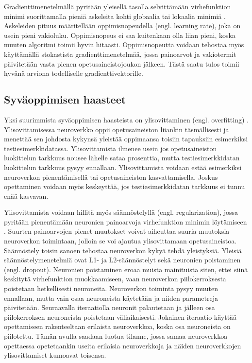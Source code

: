 \documentclass[utf8]{gradu3}
\begin{document}
Gradienttimenetelmällä pyritään yleisellä tasolla selvittämään virhefunktion minimi suorittamalla pieniä askeleita kohti globaalia tai lokaalia minimiä \parencite{nielsen2015neural}. Askeleiden pituus määritellään oppimisnopeudella (engl. learning rate), joka on usein pieni vakioluku. Oppimisnopeus ei saa kuitenkaan olla liian pieni, koska muuten algoritmi toimii hyvin hitaasti. Oppimisnopeutta voidaan tehostaa myös käyttämällä stokastista gradienttimenetelmää, jossa painoarvot ja vakiotermit päivitetään vasta pienen opetusaineistojoukon jälkeen. Tästä saatu tulos toimii hyvänä arviona todelliselle gradienttivektorille.

\subsection{Syväoppimisen haasteet}

Yksi suurimmista syväoppimisen haasteista on ylisovittaminen (engl. overfitting) \parencite{nielsen2015neural}. Ylisovittamisessa neuroverkko oppii opetusaineiston liiankin täsmällisesti ja menettää sen johdosta kykynsä yleistää oppimaansa toisiin tapauksiin esimerkiksi testiesimerkkidatassa. Ylisovittamista ilmenee usein jos opetusaineiston luokittelun tarkkuus nousee lähelle sataa prosenttia, mutta testiesimerkkidatan luokittelun tarkkuus pysyy ennallaan. Ylisovittamista voidaan estää esimerkiksi neuroverkon pienentämisellä tai opetusaineiston kasvattamisella. Joskus opettaminen voidaan myös keskeyttää, jos testiesimerkkidatan tarkkuus ei tunnu enää kasvavan.

Ylisovittamista voidaan hillitä myös säännöstelyllä (engl. regularization), jossa pyritään pienentämään neuronien painoarvoja virhefunktion minimin löytämiseen \parencite{nielsen2015neural}. Suurten painoarvojen pienet muutokset voivat aiheuttaa suuria muutoksia neuroverkon toimintaan, jolloin se voi ajautua ylisovittamaan opetusaineistoa. Säännöstely toisin sanoen tehostaa neuroverkon kykyä tehdä yleistyksiä. Yleisiä säännöstelymenetelmiä ovat L1- ja L2-säännöstelyt sekä neuronien poistaminen (engl. dropout). Neuronien poistaminen eroaa muista mainituista siten, ettei siinä keskitytä virhefunktion muokkaamiseen, vaan neuroverkon piilokerroksesta poistetaan hetkellisesti neuroneita. Neuroverkon toiminta pysyy muuten ennallaan, mutta vain osaa neuroneista käytetään ja niiden parametreja päivitetään. Seuraavalla iteraatiolla neuronit palautetaan ja jälleen osa piilokerroksen neuroneista poistetaan väliaikaisesti. Jokainen iteraatio käyttää opettamiseen rakenteeltaan erilaista neuroverkkoa, koska osa neuroneista on piilotettu. Tämän avulla saadaan luotua tilanne, jossa samaa neuroverkkoa opettaessa opetetaankin useita erilaisia neuroverkkoja ja näiden neuroverkkojen ylisovittamiset kumoavat toisensa.
\end{document}
